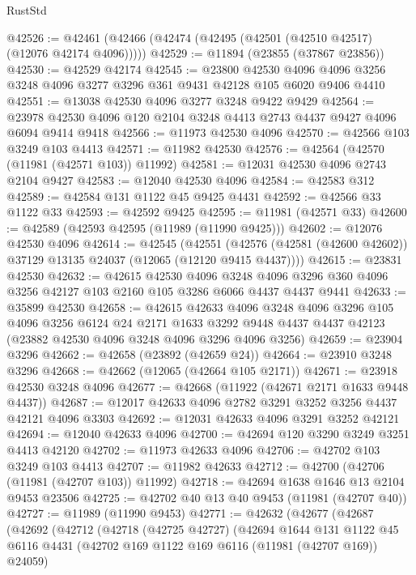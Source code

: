 \begin{lexlean}{RustStd}
\begin{coremodule}
@42526 := @42461 (@42466 (@42474 (@42495 (@42501 (@42510 @42517) (@12076 @42174 @4096)))))
@42529 := @11894 (@23855 (@37867 @23856))
@42530 := @42529 @42174
@42545 := @23800
    @42530
    @4096
    @4096
    @3256
    @3248
    @4096
    @3277
    @3296
    @361
    @9431
    @42128
    @105
    @6020
    @9406
    @4410
@42551 := @13038 @42530 @4096 @3277 @3248 @9422 @9429
@42564 := @23978 @42530 @4096 @120 @2104 @3248 @4413 @2743 @4437 @9427 @4096 @6094 @9414 @9418
@42566 := @11973 @42530 @4096
@42570 := @42566 @103 @3249 @103 @4413
@42571 := @11982 @42530
@42576 := @42564 (@42570 (@11981 (@42571 @103)) @11992)
@42581 := @12031 @42530 @4096 @2743 @2104 @9427
@42583 := @12040 @42530 @4096
@42584 := @42583 @312
@42589 := @42584 @131 @1122 @45 @9425 @4431
@42592 := @42566 @33 @1122 @33
@42593 := @42592 @9425
@42595 := @11981 (@42571 @33)
@42600 := @42589 (@42593 @42595 (@11989 (@11990 @9425)))
@42602 := @12076 @42530 @4096
@42614 := @42545
    (@42551 (@42576 (@42581 (@42600 @42602)) @37129 @13135 @24037 (@12065 (@12120 @9415 @4437))))
@42615 := @23831 @42530
@42632 := @42615
    @42530
    @4096
    @3248
    @4096
    @3296
    @360
    @4096
    @3256
    @42127
    @103
    @2160
    @105
    @3286
    @6066
    @4437
    @4437
    @9441
@42633 := @35899 @42530
@42658 := @42615
    @42633
    @4096
    @3248
    @4096
    @3296
    @105
    @4096
    @3256
    @6124
    @24
    @2171
    @1633
    @3292
    @9448
    @4437
    @4437
    @42123
    (@23882 @42530 @4096 @3248 @4096 @3296 @4096 @3256)
@42659 := @23904 @3296
@42662 := @42658 (@23892 (@42659 @24))
@42664 := @23910 @3248 @3296
@42668 := @42662 (@12065 (@42664 @105 @2171))
@42671 := @23918 @42530 @3248 @4096
@42677 := @42668 (@11922 (@42671 @2171 @1633 @9448 @4437))
@42687 := @12017 @42633 @4096 @2782 @3291 @3252 @3256 @4437 @42121 @4096 @3303
@42692 := @12031 @42633 @4096 @3291 @3252 @42121
@42694 := @12040 @42633 @4096
@42700 := @42694 @120 @3290 @3249 @3251 @4413 @42120
@42702 := @11973 @42633 @4096
@42706 := @42702 @103 @3249 @103 @4413
@42707 := @11982 @42633
@42712 := @42700 (@42706 (@11981 (@42707 @103)) @11992)
@42718 := @42694 @1638 @1646 @13 @2104 @9453 @23506
@42725 := @42702 @40 @13 @40 @9453 (@11981 (@42707 @40))
@42727 := @11989 (@11990 @9453)
@42771 := @42632
    (@42677
      (@42687
        (@42692
          (@42712
            (@42718
              (@42725 @42727)
              (@42694
                @1644
                @131
                @1122
                @45
                @6116
                @4431
                (@42702 @169 @1122 @169 @6116 (@11981 (@42707 @169)) @24059)

\end{coremodule}
\end{lexlean}
